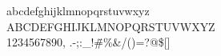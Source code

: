 \documentclass[preview]{standalone}
\begin{document}
\begin{center}
abcdefghijklmnopqrstuvwxyz\\ABCDEFGHIJKLMNOPQRSTUVWXYZ\\1234567890, .-;:_!\"\#\%&/()=?@\$[]
\end{center}
\end{document}
